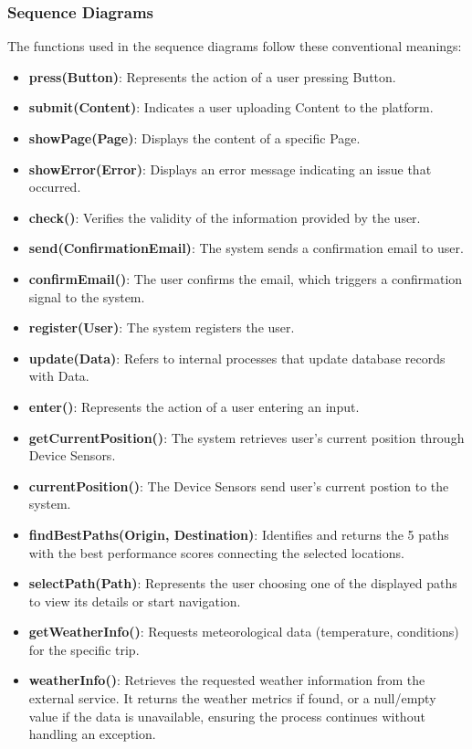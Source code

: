 \subsubsection{Sequence Diagrams}
The functions used in the sequence diagrams follow these conventional meanings:
\begin{itemize}
    \item \textbf{press(Button)}: Represents the action of a user pressing Button.
    \item \textbf{submit(Content)}: Indicates a user uploading Content to the platform.
    \item \textbf{showPage(Page)}: Displays the content of a specific Page.
    \item \textbf{showError(Error)}: Displays an error message indicating an issue that occurred.
    \item \textbf{check()}: Verifies the validity of the information provided by the user.
    \item \textbf{send(ConfirmationEmail)}: The system sends a confirmation email to user.
    \item \textbf{confirmEmail()}: The user confirms the email, which triggers a confirmation signal to the system.
    \item \textbf{register(User)}: The system registers the user.
    \item \textbf{update(Data)}: Refers to internal processes that update database records with Data.
    \item \textbf{enter()}: Represents the action of a user entering an input.
    \item \textbf{getCurrentPosition()}: The system retrieves user's current position through Device Sensors.
    \item \textbf{currentPosition()}: The Device Sensors send user's current postion to the system.
    \item \textbf{findBestPaths(Origin, Destination)}: Identifies and returns the 5 paths with the best performance scores connecting the selected locations.
    \item \textbf{selectPath(Path)}: Represents the user choosing one of the displayed paths to view its details or start navigation.
    \item \textbf{getWeatherInfo()}: Requests meteorological data (temperature, conditions) for the specific trip.
    \item \textbf{weatherInfo()}: Retrieves the requested weather information from the external service. It returns the weather metrics if found, or a null/empty value if the data is unavailable, ensuring the process continues without handling an exception.

\end{itemize}
